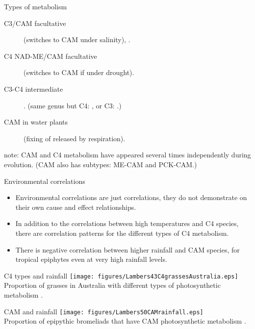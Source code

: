\documentclass[10pt]{beamer}
\begin{document}
\begin{frame}{Types of metabolism}
    \begin{description}
        \item[C3/CAM facultative]  (switches to CAM under salinity),
        .
        \item[C4 NAD-ME/CAM facultative]  (switches to CAM if under drought).
        \item[C3-C4 intermediate] .
        (same genus but C4: , or C3:
        .)
        \item[CAM in water plants]  (fixing of
        \COtwo released by respiration).
    \end{description}
    \small note: CAM and C4 metabolism have appeared several times independently
    during evolution. (CAM also has subtypes: ME-CAM and PCK-CAM.)
\end{frame}

\begin{frame}{Environmental correlations}
    \begin{itemize}
        \item Environmental correlations are just correlations, they
        do not demonstrate on their own cause and effect
        relationships.
        \item In addition to the correlations between high
        temperatures and C4 species, there are correlation patterns for the
        different types of C4 metabolism.
        \item There is negative correlation between higher rainfall and CAM species, for
        tropical epiphytes even at very high rainfall levels.
    \end{itemize}
\end{frame}

\begin{frame}{C4 types and rainfall}
    \centering
    \texttt{[image: figures/Lambers43C4grassesAustralia.eps]}\\

    {\small Proportion of grasses in Australia with different types
    of photosynthetic metabolism
    \autocite[from][]{LambersEtAl1998}.}
\end{frame}

\begin{frame}{CAM and rainfall}
    \centering
    \texttt{[image: figures/Lambers50CAMrainfall.eps]}\\

    {\small Proportion of epipythic bromeliads that have CAM photosynthetic
    metabolism
    \autocite[from][]{LambersEtAl1998}.}
\end{frame}
\end{document}
